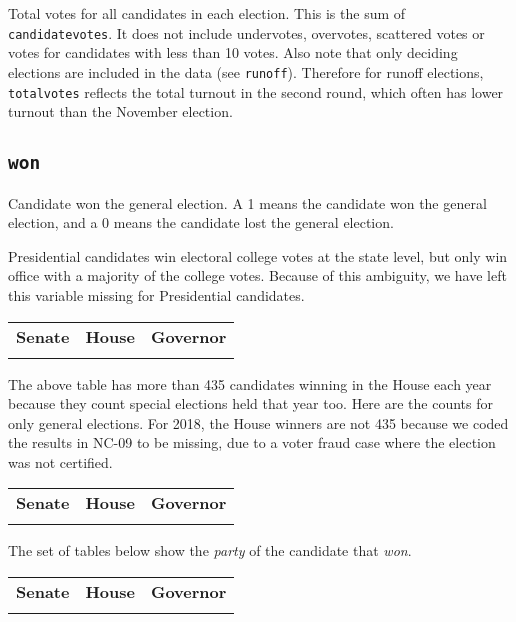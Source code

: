 \documentclass[12pt]{article}
\begin{document}
Total votes for all candidates in each election. This is the sum of \texttt{candidatevotes}. It does not include undervotes, overvotes, scattered votes or votes for candidates with less than 10 votes.  Also note that only deciding elections are included in the data (see \texttt{runoff}). Therefore for runoff elections, \texttt{totalvotes} reflects the total turnout in the second round, which often has lower turnout than the November election.



\subsection*{\texttt{won}}
Candidate won the general election. A 1 means the candidate won the general election, and a 0 means the candidate lost the general election.

Presidential candidates win electoral college votes at the state level, but only win office with a majority of the college votes. Because of this ambiguity, we have left this variable missing for Presidential candidates.

    \begin{tabularx}{\linewidth}{CCC}
    \textbf{Senate} & \textbf{House} & \textbf{Governor}\\
     &  & 
    \end{tabularx}

The above table has more than 435 candidates winning in the House each year because they count special elections held that year too. Here are the counts for only general elections. For 2018, the House winners are not 435 because we coded the results in NC-09 to be missing, due to a voter fraud case where the election was not certified.

\begin{tabularx}{\linewidth}{CCC}
    \textbf{Senate} & \textbf{House} & \textbf{Governor}\\
     &  & 
    \end{tabularx}


The set of tables below show the \emph{party} of the candidate that \emph{won}.

    \begin{tabularx}{\linewidth}{CCC}
    \textbf{Senate} & \textbf{House} & \textbf{Governor}\\
     &  & 
    \end{tabularx}
\end{document}
